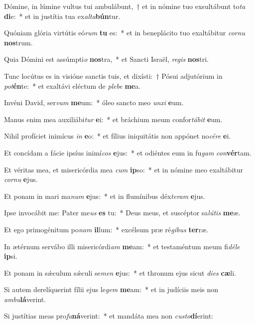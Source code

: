 \item Dómine, in lúmine vultus tui ambulábunt,~† et in nómine tuo exsultábunt to\textit{ta} \textbf{di}e:~* et in justítia tua ex\textit{al}\textit{ta}\textbf{bún}tur.
\item Quóniam glória virtútis eó\textit{rum} \textbf{tu} es:~* et in beneplácito tuo exaltábitur \textit{cor}\textit{nu} \textbf{nos}trum.
\item Quia Dómini est assúmpti\textit{o} \textbf{nos}tra,~* et Sancti Israël, \textit{re}\textit{gis} \textbf{nos}tri.
\item Tunc locútus es in visióne sanctis tuis, et dixísti:~† Pósui adjutórium in \textit{pot}\textbf{én}te:~* et exaltávi eléctum de \textit{ple}\textit{be} \textbf{me}a.
\item Invéni David, ser\textit{vum} \textbf{me}um:~* óleo sancto meo \textit{un}\textit{xi} \textbf{e}um.
\item Manus enim mea auxiliábi\textit{tur} \textbf{e}i:~* et bráchium meum confor\textit{tá}\textit{bit} \textbf{e}um.
\item Nihil profíciet inimícus \textit{in} \textbf{e}o:~* et fílius iniquitátis non appónet no\textit{cé}\textit{re} \textbf{e}i.
\item Et concídam a fácie ipsíus inimí\textit{cos} \textbf{e}jus:~* et odiéntes eum in fu\textit{gam} \textit{con}\textbf{vér}tam.
\item Et véritas mea, et misericórdia mea \textit{cum} \textbf{ip}so:~* et in nómine meo exaltábitur \textit{cor}\textit{nu} \textbf{e}jus.
\item Et ponam in mari ma\textit{num} \textbf{e}jus:~* et in flumínibus déx\textit{te}\textit{ram} \textbf{e}jus.
\item Ipse invocábit me: Pater me\textit{us} \textbf{es} tu:~* Deus meus, et suscéptor sa\textit{lú}\textit{tis} \textbf{me}æ.
\item Et ego primogénitum po\textit{nam} \textbf{il}lum:~* excélsum præ ré\textit{gi}\textit{bus} \textbf{ter}ræ.
\item In ætérnum servábo illi misericórdi\textit{am} \textbf{me}am:~* et testaméntum meum fi\textit{dé}\textit{le} \textbf{ip}si.
\item Et ponam in sǽculum sǽculi se\textit{men} \textbf{e}jus:~* et thronum ejus sicut \textit{di}\textit{es} \textbf{cæ}li.
\item Si autem derelíquerint fílii ejus le\textit{gem} \textbf{me}am:~* et in judíciis meis non \textit{am}\textit{bu}\textbf{lá}verint.
\item Si justítias meas pro\textit{fa}\textbf{ná}verint:~* et mandáta mea non \textit{cus}\textit{to}\textbf{dí}erint:
